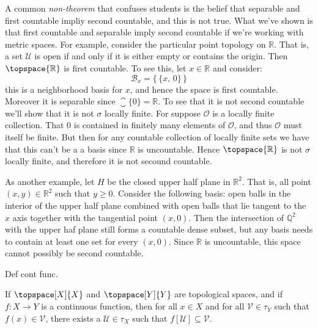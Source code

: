     \begin{example}
        A common \textit{non-theorem} that confuses students is the belief
        that separable and first countable impliy second countable, and this
        is not true. What we've shown is that first countable and separable
        imply second countable if we're working with metric spaces. For
        example, consider the particular point topology on $\mathbb{R}$.
        That is, a set $\mathcal{U}$ is open if and only if it is either
        empty or contains the origin. Then $\topspace{\mathbb{R}}$ is
        first countable. To see this, let $x\in\mathbb{R}$ and consider:
        \begin{equation}
            \mathcal{B}_{x}=\big\{\,\{x,\,0\}\,\big\}
        \end{equation}
        this is a neighborhood basis for $x$, and hence the space is first
        countable. Moreover it is separable since
        $\closure{\{0\}}=\mathbb{R}$. To see that it is not second countable
        we'll show that it is not $\sigma$ locally finite. For suppose
        $\mathcal{O}$ is a locally finite collection. That $0$ is contained
        in finitely many elements of $\mathcal{O}$, and thus $\mathcal{O}$
        must itself be finite. But then for any countable collection of
        locally finite sets we have that this can't be a a basis since
        $\mathbb{R}$ is uncountable. Hence $\topspace{\mathbb{R}}$ is not
        $\sigma$ locally finite, and therefore it is not secound countable.
    \end{example}
    \begin{example}
        As another example, let $H$ be the closed upper half plane in
        $\mathbb{R}^{2}$. That is, all point $(x,y)\in\mathbb{R}^{2}$ such
        that $y\geq{0}$. Consider the following basis: open balls in the
        interior of the upper half plane combined with open balls that lie
        tangent to the $x$ axis together with the tangential point $(x,0)$.
        Then the intersection of $\mathbb{Q}^{2}$ with the upper haf plane
        still forms a countable dense subset, but any basis needs to contain
        at least one set for every $(x,0)$. Since $\mathbb{R}$ is
        uncountable, this space cannot possibly be second countable.
    \end{example}
    Def cont func.
    \begin{theorem}
        If $\topspace[X]{X}$ and $\topspace[Y]{Y}$ are topological spaces,
        and if $f:X\rightarrow{Y}$ is a continuous function, then for all
        $x\in{X}$ and for all $\mathcal{V}\in\tau_{Y}$ such that
        $f(x)\in\mathcal{V}$, there exists a $\mathcal{U}\in\tau_{X}$ such
        that $f[\mathcal{U}]\subseteq\mathcal{V}$.
    \end{theorem}
